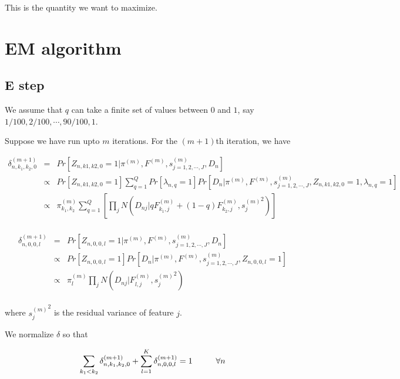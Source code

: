 \documentclass[12pt]{article}
\begin{document}
This is the quantity we want to maximize. 

\section{EM algorithm}
\subsection{E step}

We assume that $q$ can take a finite set of values between $0$ and $1$, 
say $1/100, 2/100, \cdots, 90/100, 1$.

Suppose we have run upto $m$ iterations. For the $(m+1)$th iteration, we have 

\begin{eqnarray} \nonumber
\delta^{(m+1)}_{n, k_1, k_2, 0} &=& Pr \left [ Z_{n, k1, k2, 0} = 1 | \pi^{(m)}, F^{(m)}, s^{(m)}_{j=1,2,\cdots,J}, D_{n} \right ] \\ \nonumber
 &\propto& Pr \left [ Z_{n, k1, k2,0} = 1 \right] \sum_{q=1}^{Q} Pr \left [ \lambda_{n,q} = 1 \right] Pr \left [ D_{n} | \pi^{(m)}, F^{(m)}, s^{(m)}_{j=1,2,\cdots,J}, Z_{n, k1, k2, 0}= 1, \lambda_{n, q}=1 \right] \\ \nonumber
 &\propto& \pi^{(m)}_{k_1,k_2} \sum_{q=1}^{Q} \left [ \prod_{j} N \left (D_{nj} | qF^{(m)}_{k_1,j} + (1-q)F^{(m)}_{k_2,j}, {s_j^{(m)}}^2 \right) \right ] \\ \nonumber
\end{eqnarray}

\begin{eqnarray} \nonumber
\delta^{(m+1)}_{n, 0, 0, l}  &=& Pr \left [ Z_{n, 0, 0, l} = 1  |  \pi^{(m)}, F^{(m)}, s^{(m)}_{j=1,2,\cdots,J}, D_{n} \right ] \\ \nonumber 
& \propto & Pr \left [ Z_{n, 0, 0, l} = 1 \right] Pr \left [ D_{n} | \pi^{(m)}, F^{(m)}, s^{(m)}_{j=1,2,\cdots,J}, Z_{n, 0, 0, l}= 1 \right] \\ \nonumber 
& \propto & \pi^{(m)}_{l}  \prod_{j} N \left (D_{nj} | F^{(m)}_{l,j} , {s_j^{(m)}}^2 \right) \\  \nonumber
\end{eqnarray}


where ${s_j^{(m)}}^2$ is the residual variance of feature $j$.

We normalize $\delta$ so that 

$$ \sum_{k_1 < k_2} \delta^{(m+1)}_{n, k_1, k_2, 0}  + \sum_{l=1}^{K} \delta^{(m+1)}_{n, 0, 0, l}= 1 \hspace{1 cm} \forall n $$
\end{document}
